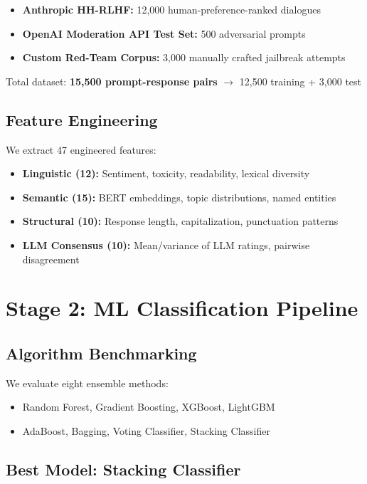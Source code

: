 \documentclass[11pt,a4paper]{article}
\begin{document}
\begin{itemize}
    \item \textbf{Anthropic HH-RLHF:} 12,000 human-preference-ranked dialogues
    \item \textbf{OpenAI Moderation API Test Set:} 500 adversarial prompts
    \item \textbf{Custom Red-Team Corpus:} 3,000 manually crafted jailbreak attempts
\end{itemize}

Total dataset: \textbf{15,500 prompt-response pairs} $\rightarrow$ 12,500 training + 3,000 test

\subsection{Feature Engineering}

We extract 47 engineered features:
\begin{itemize}
    \item \textbf{Linguistic (12):} Sentiment, toxicity, readability, lexical diversity
    \item \textbf{Semantic (15):} BERT embeddings, topic distributions, named entities
    \item \textbf{Structural (10):} Response length, capitalization, punctuation patterns
    \item \textbf{LLM Consensus (10):} Mean/variance of LLM ratings, pairwise disagreement
\end{itemize}

\section{Stage 2: ML Classification Pipeline}

\subsection{Algorithm Benchmarking}

We evaluate eight ensemble methods:
\begin{itemize}
    \item Random Forest, Gradient Boosting, XGBoost, LightGBM
    \item AdaBoost, Bagging, Voting Classifier, Stacking Classifier
\end{itemize}

\subsection{Best Model: Stacking Classifier}
\end{document}
